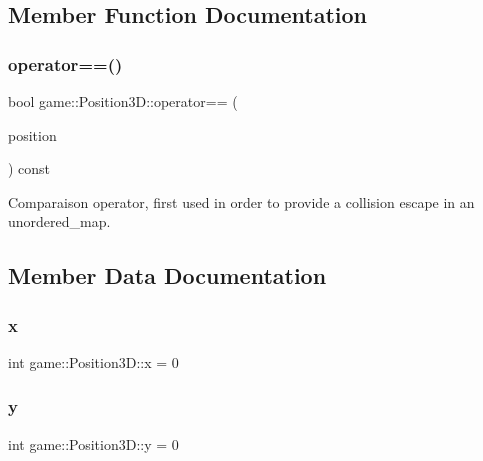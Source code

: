 \subsection{Member Function Documentation}
\mbox{\label{structgame_1_1_position3_d_a8f188c90472d7865740bcdd0d0890f43}} 
\subsubsection{\texorpdfstring{operator==()}{operator==()}}
{\footnotesize\ttfamily bool game\+::\+Position3\+D\+::operator== (\begin{DoxyParamCaption}\item[{const \hyperlink{structgame_1_1_position3_d}{Position3D} \&}]{position }\end{DoxyParamCaption}) const\hspace{0.3cm}{\ttfamily [inline]}}



Comparaison operator, first used in order to provide a collision escape in an unordered\+\_\+map. 



\subsection{Member Data Documentation}
\mbox{\label{structgame_1_1_position3_d_a425a78e73b2dae4c0e0df297d4476302}} 
\subsubsection{\texorpdfstring{x}{x}}
{\footnotesize\ttfamily int game\+::\+Position3\+D\+::x = 0}

\mbox{\label{structgame_1_1_position3_d_a5a037f3a9e438e43d7e5711ec3caefa7}} 
\subsubsection{\texorpdfstring{y}{y}}
{\footnotesize\ttfamily int game\+::\+Position3\+D\+::y = 0}

